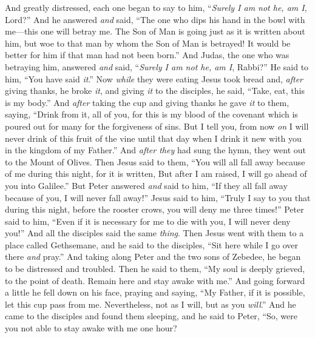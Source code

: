 \begin{biblechapter}
\verse And greatly distressed, each one began to say to him, “\textit{Surely I am not he, am I}, Lord?”
\verse And he answered \textit{and} said, “The one who dips his hand in the bowl with me—this one will betray me.
\verse The Son of Man is going just as it is written about him, but woe to that man by whom the Son of Man is betrayed! It would be better for him if that man had not been born.”
\verse And Judas, the one who was betraying him, answered \textit{and} said, “\textit{Surely I am not he, am I}, Rabbi?” He said to him, “You have said \textit{it}.”
 Now \textit{while} they were eating Jesus took bread and, \textit{after} giving thanks, he broke \textit{it}, and giving \textit{it} to the disciples, he said, “Take, eat, this is my body.”
\verse And \textit{after} taking the cup and giving thanks he gave \textit{it} to them, saying, “Drink from it, all of you,
\verse for this is my blood of the covenant which is poured out for many for the forgiveness of sins.
\verse But I tell you, from now \textit{on} I will never drink of this fruit of the vine until that day when I drink it new with you in the kingdom of my Father.”
\verse And \textit{after they} had sung the hymn, they went out to the Mount of Olives.
 Then Jesus said to them, “You will all fall away because of me during this night, for it is written,
\verse But after I am raised, I will go ahead of you into Galilee.”
\verse But Peter answered \textit{and} said to him, “If they all fall away because of you, I will never fall away!”
\verse Jesus said to him, “Truly I say to you that during this night, before the rooster crows, you will deny me three times!”
\verse Peter said to him, “Even if it is necessary for me to die with you, I will never deny you!” And all the disciples said the same \textit{thing}.
 Then Jesus went with them to a place called Gethsemane, and he said to the disciples, “Sit here while I go over there \textit{and} pray.”
\verse And taking along Peter and the two sons of Zebedee, he began to be distressed and troubled.
\verse Then he said to them, “My soul is deeply grieved, to the point of death. Remain here and stay awake with me.”
\verse And going forward a little he fell down on his face, praying and saying, “My Father, if it is possible, let this cup pass from me. Nevertheless, not as I will, but as you \textit{will}.”
\verse And he came to the disciples and found them sleeping, and he said to Peter, “So, were you not able to stay awake with me one hour?

\end{biblechapter}
